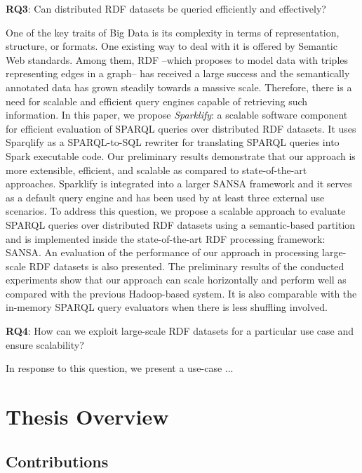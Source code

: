 \begin{tcolorbox}
\textbf{RQ3}: Can distributed RDF datasets be queried efficiently and effectively?
\end{tcolorbox}

One of the key traits of Big Data is its complexity in terms of representation, structure, or formats.
One existing way to deal with it is offered by Semantic Web standards.
Among them, \gls{RDF} --which proposes to model data with triples representing edges in a graph-- has received a large success and the semantically annotated data has grown steadily towards a massive scale.
Therefore, there is a need for scalable and efficient query engines capable of retrieving such information.
In this paper, we propose \emph{Sparklify}: a scalable software component for efficient evaluation of SPARQL queries over distributed RDF datasets. It uses Sparqlify as a SPARQL-to-SQL rewriter for translating SPARQL queries into Spark executable code.
Our preliminary results demonstrate that our approach is more extensible, efficient, and scalable as compared to state-of-the-art approaches.
Sparklify is integrated into a larger SANSA framework and it serves as a default query engine and has been used by at least three external use scenarios.
To address this question, we propose a scalable approach to evaluate SPARQL queries over distributed RDF datasets using a semantic-based partition and is implemented inside the state-of-the-art \gls{RDF} processing framework: SANSA.
An evaluation of the performance of our approach in processing large-scale RDF datasets is also presented. 
The preliminary results of the conducted experiments show that our approach can scale horizontally and perform well as compared with the previous Hadoop-based system.
It is also comparable with the in-memory SPARQL query evaluators when there is less shuffling involved.


\begin{tcolorbox}
\textbf{RQ4}: How can we exploit large-scale RDF datasets for a particular use case and ensure scalability?
\end{tcolorbox}
In response to this question, we present a use-case ...


\section{Thesis Overview}
\label{sec:thesis-overview}

\subsection{Contributions}
